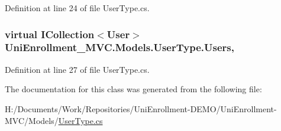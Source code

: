 Definition at line 24 of file User\+Type.\+cs.

\subsubsection[{\texorpdfstring{Users}{Users}}]{\setlength{\rightskip}{0pt plus 5cm}virtual I\+Collection$<${\bf User}$>$ Uni\+Enrollment\+\_\+\+M\+V\+C.\+Models.\+User\+Type.\+Users\hspace{0.3cm}{\ttfamily [get]}, {\ttfamily [set]}}\hypertarget{class_uni_enrollment___m_v_c_1_1_models_1_1_user_type_a6520e4f4b273c006fdf1926e51b4816b}{}\label{class_uni_enrollment___m_v_c_1_1_models_1_1_user_type_a6520e4f4b273c006fdf1926e51b4816b}


Definition at line 27 of file User\+Type.\+cs.



The documentation for this class was generated from the following file\+:\begin{DoxyCompactItemize}
\item 
H\+:/\+Documents/\+Work/\+Repositories/\+Uni\+Enrollment-\/\+D\+E\+M\+O/\+Uni\+Enrollment-\/\+M\+V\+C/\+Models/\hyperlink{_user_type_8cs}{User\+Type.\+cs}\end{DoxyCompactItemize}
